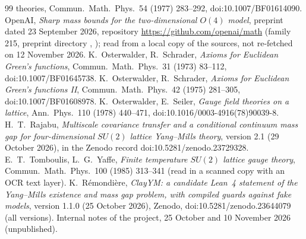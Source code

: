 \documentclass[11pt,a4paper]{article}
\theoremstyle{plain}
\theoremstyle{definition}
\theoremstyle{remark}
\numberwithin{equation}{section}
\begin{document}
{\begin{thebibliography}{99}
{theories}, Commun.\ Math.\ Phys.\ 54 (1977) 283--292, doi:10.1007/BF01614090.
 OpenAI, \emph{Sharp mass bounds for the two-dimensional $O(4)$ model}, preprint dated 23 September 2026, repository
\url{https://github.com/openai/math} (family 215, preprint directory ,
); read from a local copy of the sources, not re-fetched on 12 November 2026.
 K.~Osterwalder, R.~Schrader, \emph{Axioms for Euclidean Green's functions}, Commun.\ Math.\ Phys.\ 31 (1973) 83--112,
doi:10.1007/BF01645738.
 K.~Osterwalder, R.~Schrader, \emph{Axioms for Euclidean Green's functions II}, Commun.\ Math.\ Phys.\ 42 (1975)
281--305, doi:10.1007/BF01608978.
 K.~Osterwalder, E.~Seiler, \emph{Gauge field theories on a lattice}, Ann.\ Phys.\ 110 (1978) 440--471,
doi:10.1016/0003-4916(78)90039-8.
 H.~T.~Rajabu, \emph{Multiscale covariance transfer and a conditional continuum mass gap for four-dimensional $SU(2)$
lattice Yang--Mills theory}, version 2.1 (29 October 2026), in the Zenodo record doi:10.5281/zenodo.23729328.
 E.~T.~Tomboulis, L.~G.~Yaffe, \emph{Finite temperature $SU(2)$ lattice gauge theory}, Commun.\ Math.\ Phys.\ 100 (1985) 313--341 (read in a scanned copy with an OCR text layer).
 K.~R\'emondi\`ere, \emph{ClayYM: a candidate Lean~4 statement of the Yang--Mills existence and mass gap problem, with
compiled guards against fake models}, version 1.1.0 (25 October 2026), Zenodo, doi:10.5281/zenodo.23644079 (all versions).
 Internal notes of the project, 25 October and 10 November 2026 (unpublished).
\end{thebibliography}}
\end{document}
